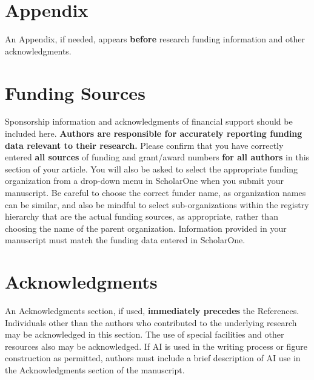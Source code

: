 \documentclass[journal ]{new-aiaa}
\begin{document}
\section*{Appendix}

An Appendix, if needed, appears \textbf{before} research funding information and other acknowledgments.

\section*{Funding Sources}

Sponsorship information and acknowledgments of financial support should be included here. \textbf{Authors are responsible for accurately reporting funding data relevant to their research.} Please confirm that you have correctly entered \textbf{all sources} of funding and grant/award numbers \textbf{for all authors} in this section of your article. You will also be asked to select the appropriate funding organization from a drop-down menu in ScholarOne when you submit your manuscript. Be careful to choose the correct funder name, as organization names can be similar, and also be mindful to select sub-organizations within the registry hierarchy that are the actual funding sources, as appropriate, rather than choosing the name of the parent organization. Information provided in your manuscript must match the funding data entered in ScholarOne.

\section*{Acknowledgments}
An Acknowledgments section, if used, \textbf{immediately precedes} the References. Individuals other than the authors who contributed to the underlying research may be acknowledged in this section. The use of special facilities and other resources also may be acknowledged. If AI is used in the writing process or figure construction as permitted, authors must include a brief description of AI use in the Acknowledgments section of the manuscript.


\end{document}
